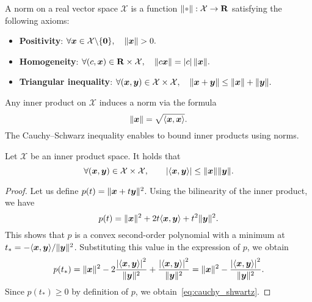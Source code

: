 \begin{definition}
A norm on a real vector space $\mathcal X$ is a function $\norm{\placeholder}: \mathcal X \to \real$ satisfying the following axioms:
\begin{itemize}
    \item
        \textbf{Positivity}:
        \(
            \forall \mathbf{\boldsymbol{x}} \in \mathcal X \backslash \{\mathbf{\boldsymbol{0}}\}, \quad
            \lVert\mathbf{\boldsymbol{x}}\rVert > 0.
        \)

    \item
        \textbf{Homogeneity}:
        \(
            \forall (c, \mathbf{\boldsymbol{x}}) \in \mathbf R \times \mathcal X, \quad
            \lVert c \mathbf{\boldsymbol{x}}\rVert = \lvert c\rvert \, \lVert\mathbf{\boldsymbol{x}}\rVert .
        \)

    \item
        \textbf{Triangular inequality}:
        \(
            \forall (\mathbf{\boldsymbol{x}}, \mathbf{\boldsymbol{y}}) \in \mathcal X \times \mathcal X, \quad
            \lVert\mathbf{\boldsymbol{x}} + \mathbf{\boldsymbol{y}}\rVert \leq \lVert\mathbf{\boldsymbol{x}}\rVert + \lVert\mathbf{\boldsymbol{y}}\rVert.
        \)
\end{itemize}
\end{definition}
Any inner product on $\mathcal X$ induces a norm via the formula
\begin{equation}
    \label{eq:induced_norm}%
    \norm{\vect x} = \sqrt{\ip{\vect x, \vect x}}.
\end{equation}
The Cauchy--Schwarz inequality enables to bound inner products using norms.
\begin{proposition}
    \label{proposition:cauchy_shwartz}
    Let $\mathcal X$ be an inner product space.
    It holds that
    \begin{equation}
        \label{eq:cauchy_shwartz}
        \forall  (\vect x, \vect y) \in \mathcal X \times \mathcal X, \qquad
        \abs[big]{\ip{\vect x, \vect y}} \leq \norm{\vect x} \norm{\vect y}.
    \end{equation}
\end{proposition}
\begin{proof}
    Let us define $p(t) = \lVert\mathbf{\boldsymbol{x}} + t \mathbf{\boldsymbol{y}}\rVert^2$.
    Using the bilinearity of the inner product,
    we have
    \[
        p(t) = \lVert\mathbf{\boldsymbol{x}}\rVert^2 + 2 t \langle\mathbf{\boldsymbol{x}}, \mathbf{\boldsymbol{y}}\rangle + t^2 \lVert\mathbf{\boldsymbol{y}}\rVert^2.
    \]
    This shows that $p$ is a convex second-order polynomial with a minimum at $t_* = - \langle\mathbf{\boldsymbol{x}}, \mathbf{\boldsymbol{y}}\rangle / \lVert\mathbf{\boldsymbol{y}}\rVert^2$.
    Substituting this value in the expression of $p$,
    we obtain
    \[
        p(t_*) = \norm{\vect x}^2 - 2 \frac{\abs[big]{\ip{\vect x, \vect y}}^2}{\norm{\vect y}^2} +  \frac{\abs[big]{\ip{\vect x, \vect y}}^2}{\norm{\vect y}^2}
        = \norm{\vect x}^2 - \frac{\abs[big]{\ip{\vect x, \vect y}}^2}{\norm{\vect y}^2}.
    \]
    Since $p(t_*) \geq 0$ by definition of $p$,
    we obtain~\eqref{eq:cauchy_shwartz}.
\end{proof}

